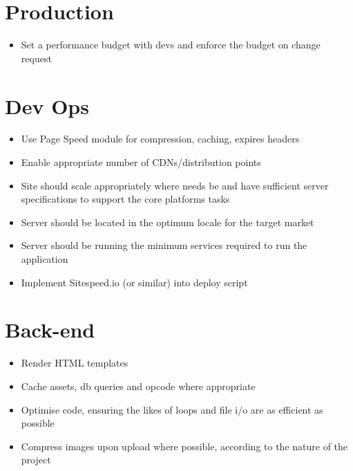 \documentclass[letterpaper,10pt,english]{sphinxmanual}
\begin{document}
\section{Production}
\label{performance_plan:production}\begin{itemize}
\item {} 
Set a performance budget with devs and enforce the budget on change request

\end{itemize}


\section{Dev Ops}
\label{performance_plan:dev-ops}\begin{itemize}
\item {} 
Use Page Speed module for compression, caching, expires headers

\item {} 
Enable appropriate number of CDNs/distribution points

\item {} 
Site should scale appropriately where needs be and have sufficient server specifications to support the core platforms tasks

\item {} 
Server should be located in the optimum locale for the target market

\item {} 
Server should be running the minimum services required to run the application

\item {} 
Implement Sitespeed.io (or similar) into deploy script

\end{itemize}


\section{Back-end}
\label{performance_plan:back-end}\begin{itemize}
\item {} 
Render HTML templates

\item {} 
Cache assets, db queries and opcode where appropriate

\item {} 
Optimise code, ensuring the likes of loops and file i/o are as efficient as possible

\item {} 
Compress images upon upload where possible, according to the nature of the project

\end{itemize}
\end{document}

